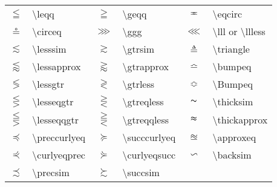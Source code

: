 \documentclass[a4paper]{ctexart}
\begin{document}
\begin{table}
\begin{tabular}{clclcl}
        $\leqq$                 & \textbackslash leqq               & $\geqq$           & \textbackslash geqq           &
        $\eqcirc$               & \textbackslash eqcirc                                                                 \\
        $\circeq$               & \textbackslash circeq             & $\ggg$            & \textbackslash ggg            &
        $\lll$                  & \textbackslash lll or \textbackslash llless                                           \\
        $\lesssim$              & \textbackslash lesssim            & $\gtrsim$         & \textbackslash gtrsim         &
        $\triangleq$            & \textbackslash triangle                                                               \\
        $\lessapprox$           & \textbackslash lessapprox         & $\gtrapprox$      & \textbackslash gtrapprox      &
        $\bumpeq$               & \textbackslash bumpeq                                                                 \\
        $\lessgtr$              & \textbackslash lessgtr            & $\gtrless$        & \textbackslash gtrless        &
        $\Bumpeq$               & \textbackslash Bumpeq                                                                 \\
        $\lesseqgtr$            & \textbackslash lesseqgtr          & $\gtreqless$      & \textbackslash gtreqless      &
        $\thicksim$             & \textbackslash thicksim                                                               \\
        $\lesseqqgtr$           & \textbackslash lesseqqgtr         & $\gtreqqless$     & \textbackslash gtreqqless     &
        $\thickapprox$          & \textbackslash thickapprox                                                            \\
        $\preccurlyeq$          & \textbackslash preccurlyeq        & $\succcurlyeq$    & \textbackslash succcurlyeq    &
        $\approxeq$             & \textbackslash approxeq                                                               \\
        $\curlyeqprec$          & \textbackslash curlyeqprec        & $\curlyeqsucc$    & \textbackslash curlyeqsucc    &
        $\backsim$              & \textbackslash backsim                                                                \\
        $\precsim$              & \textbackslash precsim            & $\succsim$        & \textbackslash succsim        &

\end{tabular}
\end{table}
\end{document}
